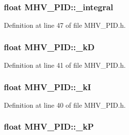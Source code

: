 \hypertarget{class_m_h_v___p_i_d_a26def3787ab18a8681c361720090b0df}{
\subsubsection[{\-\_\-integral}]{\setlength{\rightskip}{0pt plus 5cm}float M\-H\-V\-\_\-\-P\-I\-D\-::\-\_\-integral\hspace{0.3cm}{\ttfamily [protected]}}}\label{class_m_h_v___p_i_d_a26def3787ab18a8681c361720090b0df}


Definition at line 47 of file M\-H\-V\-\_\-\-P\-I\-D.\-h.

\hypertarget{class_m_h_v___p_i_d_a64e69c4f8d1823d16314c88f98a4e18b}{
\subsubsection[{\-\_\-k\-D}]{\setlength{\rightskip}{0pt plus 5cm}float M\-H\-V\-\_\-\-P\-I\-D\-::\-\_\-k\-D\hspace{0.3cm}{\ttfamily [protected]}}}\label{class_m_h_v___p_i_d_a64e69c4f8d1823d16314c88f98a4e18b}


Definition at line 41 of file M\-H\-V\-\_\-\-P\-I\-D.\-h.

\hypertarget{class_m_h_v___p_i_d_a47e47fe3d120325d9b12e205a274dcaa}{
\subsubsection[{\-\_\-k\-I}]{\setlength{\rightskip}{0pt plus 5cm}float M\-H\-V\-\_\-\-P\-I\-D\-::\-\_\-k\-I\hspace{0.3cm}{\ttfamily [protected]}}}\label{class_m_h_v___p_i_d_a47e47fe3d120325d9b12e205a274dcaa}


Definition at line 40 of file M\-H\-V\-\_\-\-P\-I\-D.\-h.

\hypertarget{class_m_h_v___p_i_d_a2987b7582914a11ec39c38c2c2f8bb4f}{
\subsubsection[{\-\_\-k\-P}]{\setlength{\rightskip}{0pt plus 5cm}float M\-H\-V\-\_\-\-P\-I\-D\-::\-\_\-k\-P\hspace{0.3cm}{\ttfamily [protected]}}}\label{class_m_h_v___p_i_d_a2987b7582914a11ec39c38c2c2f8bb4f}


